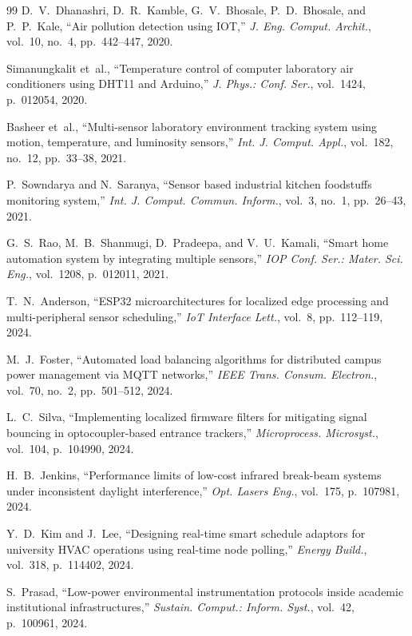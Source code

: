 \begin{thebibliography}{99}
D.~V.~Dhanashri, D.~R.~Kamble, G.~V.~Bhosale, P.~D.~Bhosale, and P.~P.~Kale, ``Air pollution detection using IOT,'' \textit{J. Eng. Comput. Archit.}, vol.~10, no.~4, pp.~442--447, 2020.

Simanungkalit et~al., ``Temperature control of computer laboratory air conditioners using DHT11 and Arduino,'' \textit{J. Phys.: Conf. Ser.}, vol.~1424, p.~012054, 2020.

Basheer et~al., ``Multi-sensor laboratory environment tracking system using motion, temperature, and luminosity sensors,'' \textit{Int. J. Comput. Appl.}, vol.~182, no.~12, pp.~33--38, 2021.

P.~Sowndarya and N.~Saranya, ``Sensor based industrial kitchen foodstuffs monitoring system,'' \textit{Int. J. Comput. Commun. Inform.}, vol.~3, no.~1, pp.~26--43, 2021.

G.~S.~Rao, M.~B.~Shanmugi, D.~Pradeepa, and V.~U.~Kamali, ``Smart home automation system by integrating multiple sensors,'' \textit{IOP Conf. Ser.: Mater. Sci. Eng.}, vol.~1208, p.~012011, 2021.

T.~N.~Anderson, ``ESP32 microarchitectures for localized edge processing and multi-peripheral sensor scheduling,'' \textit{IoT Interface Lett.}, vol.~8, pp.~112--119, 2024.

M.~J.~Foster, ``Automated load balancing algorithms for distributed campus power management via MQTT networks,'' \textit{IEEE Trans. Consum. Electron.}, vol.~70, no.~2, pp.~501--512, 2024.

L.~C.~Silva, ``Implementing localized firmware filters for mitigating signal bouncing in optocoupler-based entrance trackers,'' \textit{Microprocess. Microsyst.}, vol.~104, p.~104990, 2024.

H.~B.~Jenkins, ``Performance limits of low-cost infrared break-beam systems under inconsistent daylight interference,'' \textit{Opt. Lasers Eng.}, vol.~175, p.~107981, 2024.

Y.~D.~Kim and J.~Lee, ``Designing real-time smart schedule adaptors for university HVAC operations using real-time node polling,'' \textit{Energy Build.}, vol.~318, p.~114402, 2024.

S.~Prasad, ``Low-power environmental instrumentation protocols inside academic institutional infrastructures,'' \textit{Sustain. Comput.: Inform. Syst.}, vol.~42, p.~100961, 2024.


\end{thebibliography}
